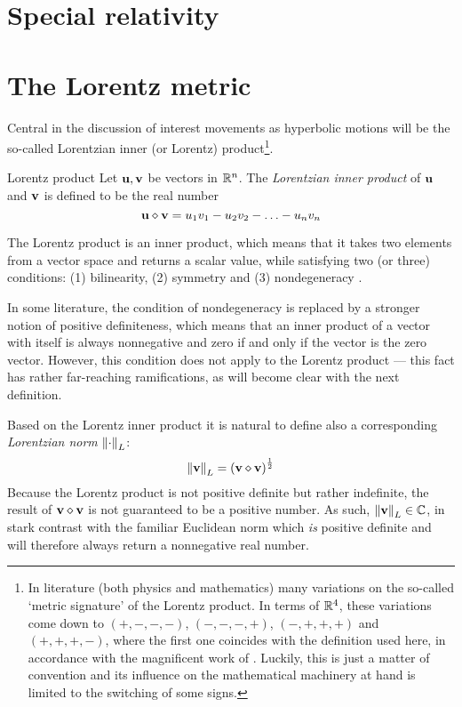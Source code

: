 \section{Special relativity}

\section{The Lorentz metric}
\label{sec:lorentz_metric}
Central in the discussion of interest movements as hyperbolic motions will be the so-called Lorentzian inner (or Lorentz) product\footnote{In literature (both physics and mathematics) many variations on the so-called `metric signature' of the Lorentz product. In terms of \(\mathbb{R}^4\), these variations come down to \((+,-,-,-)\), \((-,-,-,+)\), \((-,+,+,+)\) and \((+,+,+,-)\), where the first one coincides with the definition used here, in accordance with the magnificent work of \citet{Landau1971}. Luckily, this is just a matter of convention and its influence on the mathematical machinery at hand is limited to the switching of some signs.}.
\begin{block}{Lorentz product}
    Let \(\vb{u}, \vb{v}\) be vectors in \(\mathbb{R}^n\). The \emph{Lorentzian inner product} of \(\vb{u}\) and \(\vb{v}\) is defined to be the real number
    \[
     \vb{u} \diamond \vb{v} = u_1v_1 - u_2v_2 - \ldots - u_nv_n
\]
\end{block}
The Lorentz product is an inner product, which means that it takes two elements from a vector space and returns a scalar value, while satisfying two (or three) conditions: (1) bilinearity, (2) symmetry and (3) nondegeneracy \cite{Ratcliffe2019}.

In some literature, the condition of nondegeneracy is replaced by a stronger notion of positive definiteness, which means that an inner product of a vector with itself is always nonnegative and zero if and only if the vector is the zero vector. However, this condition does not apply to the Lorentz product --- this fact has rather far-reaching ramifications, as will become clear with the next definition. 

Based on the Lorentz inner product it is natural to define also a corresponding \emph{Lorentzian norm} \(\norm{\cdot}_L\):
    \[
     \norm{\vb{v}}_L = \qty(\vb{v}\diamond\vb{v})^\frac{1}{2}
\]
Because the Lorentz product is not positive definite but rather indefinite, the result of \(\vb{v}\diamond\vb{v}\) is not guaranteed to be a positive number. As such, \(\norm{\vb{v}}_L \in \mathbb{C}\), in stark contrast with the familiar Euclidean norm which \emph{is} positive definite and will therefore always return a nonnegative real number.

